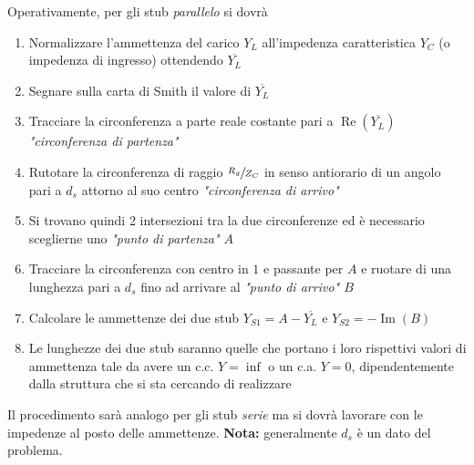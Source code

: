 \documentclass{article}
\begin{document}
Operativamente, per gli stub \textit{parallelo} si dovrà
\begin{enumerate}
	\item Normalizzare l'ammettenza del carico \(Y_L\) all'impedenza caratteristica \(Y_C\) (o impedenza di ingresso) ottendendo \(\overline{Y_L}\)
	\item Segnare sulla carta di Smith il valore di \(\overline{Y_L}\)
	\item Tracciare la circonferenza a parte reale costante pari a \(\operatorname{Re}(\overline{Y_L}) \) \textit{"circonferenza di partenza"}
	\item Rutotare la circonferenza di raggio \(\sfrac{R_g}{Z_C}\) in senso antiorario di un angolo pari a \(d_s\) attorno al suo centro \textit{"circonferenza di arrivo"}
	\item Si trovano quindi 2 intersezioni tra la due circonferenze ed è necessario sceglierne uno \textit{"punto di partenza" \(A\)}
	\item Tracciare la circonferenza con centro in \(1\) e passante per \(A\) e ruotare di una lunghezza pari a \(d_s\) fino ad arrivare al \textit{"punto di arrivo" \(B\)}
	\item Calcolare le ammettenze dei due stub \(Y_{S1} = A - \overline{Y_L}\) e \(Y_{S2} = -\operatorname{Im}(B) \)
	\item Le lunghezze dei due stub saranno quelle che portano i loro rispettivi valori di ammettenza tale da avere un c.c. \( Y = \inf \) o un c.a. \( Y = 0 \), dipendentemente dalla struttura che si sta cercando di realizzare
\end{enumerate}
Il procedimento sarà analogo per gli stub \textit{serie} ma si dovrà lavorare con le impedenze al posto delle ammettenze.
\textbf{Nota:} generalmente \(d_s\) è un dato del problema.
\end{document}
